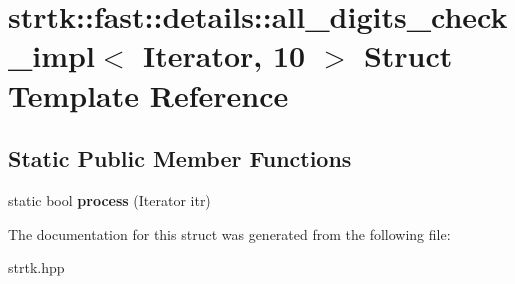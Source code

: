 \hypertarget{structstrtk_1_1fast_1_1details_1_1all__digits__check__impl_3_01Iterator_00_0110_01_4}{\section{strtk\-:\-:fast\-:\-:details\-:\-:all\-\_\-digits\-\_\-check\-\_\-impl$<$ Iterator, 10 $>$ Struct Template Reference}
\label{structstrtk_1_1fast_1_1details_1_1all__digits__check__impl_3_01Iterator_00_0110_01_4}
}
\subsection*{Static Public Member Functions}
\begin{DoxyCompactItemize}
\item 
\hypertarget{structstrtk_1_1fast_1_1details_1_1all__digits__check__impl_3_01Iterator_00_0110_01_4_afad71c3613b2cba0c8d142ea1a7246a3}{static bool {\bfseries process} (Iterator itr)}\label{structstrtk_1_1fast_1_1details_1_1all__digits__check__impl_3_01Iterator_00_0110_01_4_afad71c3613b2cba0c8d142ea1a7246a3}

\end{DoxyCompactItemize}


The documentation for this struct was generated from the following file\-:\begin{DoxyCompactItemize}
\item 
strtk.\-hpp\end{DoxyCompactItemize}
